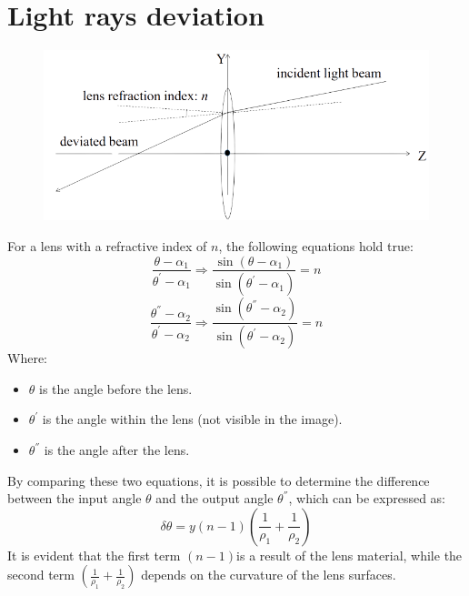 \section{Light rays deviation}

\begin{figure}[H]
    \centering
    \includegraphics[width=0.4\linewidth]{images/ray.png}
\end{figure}
For a lens with a refractive index of $n$, the following equations hold true:
\[\dfrac{\theta-\alpha_1}{\theta^{'}-\alpha_1} \Rightarrow \dfrac{\sin{(\theta-\alpha_1)}}{\sin{(\theta^{'}-\alpha_1)}}=n\]
\[\dfrac{\theta^{''}-\alpha_2}{\theta^{'}-\alpha_2} \Rightarrow \dfrac{\sin{(\theta^{''}-\alpha_2)}}{\sin{(\theta^{'}-\alpha_2)}}=n\]
Where:
\begin{itemize}
    \item $\theta$ is the angle before the lens. 
    \item $\theta^{'}$ is the angle within the lens (not visible in the image). 
    \item $\theta^{''}$ is the angle after the lens.
\end{itemize}
By comparing these two equations, it is possible to determine the difference between the input angle $\theta$ and the output angle $\theta^{''}$, which can be expressed as:
\[\delta \theta=y(n-1)\left( \dfrac{1}{\rho_1} + \dfrac{1}{\rho_2}\right)\]
It is evident that the first term $(n-1)$is a result of the lens material, while the second term $\left( \frac{1}{\rho_1} + \frac{1}{\rho_2}\right)$ depends on the curvature of the lens surfaces.